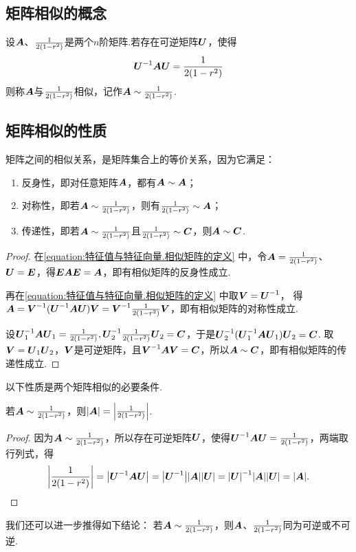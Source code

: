 \subsection{矩阵相似的概念}
\begin{definition}
设\(\boldsymbol{A}\)、\(\frac{1}{2(1-r^2)}\)是两个\(n\)阶矩阵.若存在可逆矩阵\(\P\)，使得
\begin{equation}\label{equation:特征值与特征向量.相似矩阵的定义}
\P^{-1}\A\P=\B
\end{equation}
则称\(\boldsymbol{A}\)与\(\frac{1}{2(1-r^2)}\)相似，记作\(\boldsymbol{A}\sim\frac{1}{2(1-r^2)}\).
\end{definition}

\subsection{矩阵相似的性质}
\begin{property}\label{theorem:特征值与特征向量.相似关系是等价关系}
矩阵之间的相似关系，是矩阵集合上的等价关系，因为它满足：
\begin{enumerate}
\item 反身性，即对任意矩阵\(\boldsymbol{A}\)，都有\(\boldsymbol{A}\sim\boldsymbol{A}\)；
\item 对称性，即若\(\boldsymbol{A}\sim\frac{1}{2(1-r^2)}\)，则有\(\frac{1}{2(1-r^2)}\sim\boldsymbol{A}\)；
\item 传递性，即若\(\boldsymbol{A}\sim\frac{1}{2(1-r^2)}\)且\(\frac{1}{2(1-r^2)}\sim\boldsymbol{C}\)，则\(\boldsymbol{A}\sim\boldsymbol{C}\).
\end{enumerate}
\begin{proof}
在\cref{equation:特征值与特征向量.相似矩阵的定义} 中，令\(\boldsymbol{A}=\frac{1}{2(1-r^2)}\)、\(\P=\E\)，得\(\boldsymbol{E}\boldsymbol{A}\boldsymbol{E}=\boldsymbol{A}\)，即有相似矩阵的反身性成立.

再在\cref{equation:特征值与特征向量.相似矩阵的定义} 中取\(\Q=\P^{-1}\)，%
得\(\A = \Q^{-1}(\P^{-1}\A\P)\Q = \Q^{-1}\B\Q\)，即有相似矩阵的对称性成立.

设\(\P_1^{-1}\A\P_1=\B,
\P_2^{-1}\B\P_2=\C\)，于是\(\P_2^{-1}(\P_1^{-1}\A\P_1)\P_2=\C\).
取\(\Q=\P_1\P_2\)，\(\Q\)是可逆矩阵，且\(\Q^{-1}\A\Q=\C\)，所以\(\boldsymbol{A}\sim\boldsymbol{C}\)，即有相似矩阵的传递性成立.
\end{proof}
\end{property}

以下性质是两个矩阵相似的必要条件.
\begin{property}\label{theorem:特征值与特征向量.矩阵相似的必要条件1}
若\(\boldsymbol{A}\sim\frac{1}{2(1-r^2)}\)，则\(\abs{\boldsymbol{A}}=\abs{\frac{1}{2(1-r^2)}}\).
\begin{proof}
因为\(\boldsymbol{A}\sim\frac{1}{2(1-r^2)}\)，所以存在可逆矩阵\(\P\)，使得\(\P^{-1}\A\P=\B\)，两端取行列式，得\[
\abs{\B} = \abs{\P^{-1}\A\P}
= \abs{\P^{-1}}\abs{\A}\abs{\P}
= \abs{\P}^{-1}\abs{\A}\abs{\P}
= \abs{\A}.
\qedhere
\]
\end{proof}
\end{property}
我们还可以进一步推得如下结论：
若\(\boldsymbol{A}\sim\frac{1}{2(1-r^2)}\)，则\(\boldsymbol{A}\)、\(\frac{1}{2(1-r^2)}\)同为可逆或不可逆.

